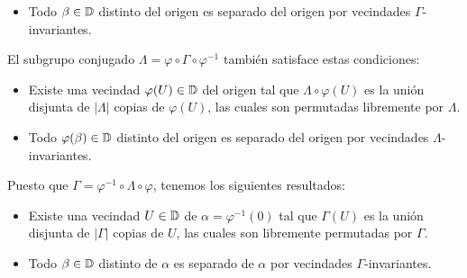 \begin{solution}
\begin{enumerate}[label=\alph*)]
\begin{itemize}
        \item Todo $\beta \in \mathbb D$ distinto del origen es separado del origen por vecindades $\Gamma$-invariantes.
    \end{itemize}
    
    El subgrupo conjugado $\Lambda = \varphi \circ \Gamma \circ \varphi^{-1}$ también satisface estas condiciones:
    \begin{itemize}
        \item Existe una vecindad $\varphi(U) \in \mathbb D$ del origen tal que $\Lambda \circ \varphi(U)$ es la unión disjunta de $|\Lambda|$ copias de $\varphi(U)$, las cuales son permutadas libremente por $\Lambda$.
        
        \item Todo $\varphi(\beta) \in \mathbb D$ distinto del origen es separado del origen por vecindades $\Lambda$-invariantes.
    \end{itemize}
    
    Puesto que $\Gamma = \varphi^{-1} \circ \Lambda \circ \varphi$, tenemos los siguientes resultados:
    \begin{itemize}
        \item Existe una vecindad $U \in \mathbb D$ de $\alpha = \varphi^{-1}(0)$ tal que $\Gamma(U)$ es la unión disjunta de $|\Gamma|$ copias de $U$, las cuales son libremente permutadas por $\Gamma$.
        
        \item Todo $\beta \in \mathbb D$ distinto de $\alpha$ es separado de $\alpha$ por vecindades $\Gamma$-invariantes.
    \end{itemize}
\end{enumerate}
\end{solution}
